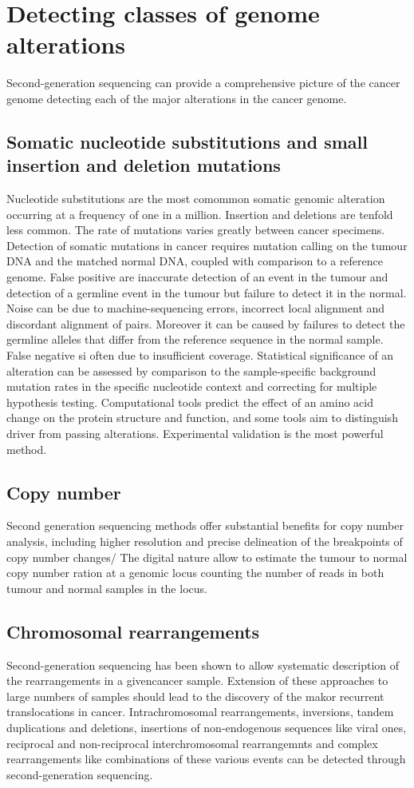 \section{Detecting classes of genome alterations}
Second-generation sequencing can provide a comprehensive picture of the cancer genome detecting each of the major alterations in the cancer genome.

	\subsection{Somatic nucleotide substitutions and small insertion and deletion mutations}
	Nucleotide substitutions are the most comommon somatic genomic alteration occurring at a frequency of one in a million.
	Insertion and deletions are tenfold less common.
	The rate of mutations varies greatly between cancer specimens.
	Detection of somatic mutations in cancer requires mutation calling on the tumour DNA and the matched normal DNA, coupled with comparison to a reference genome.
	False positive are inaccurate detection of an event in the tumour and detection of a germline event in the tumour but failure to detect it in the normal.
	Noise can be due to machine-sequencing errors, incorrect local alignment and discordant alignment of pairs.
	Moreover it can be caused by failures to detect the germline alleles that differ from the reference sequence in the normal sample.
	False negative si often due to insufficient coverage.
	Statistical significance of an alteration can be assessed by comparison to the sample-specific background mutation rates in the specific nucleotide context and correcting for multiple hypothesis testing.
	Computational tools predict the effect of an amino acid change on the protein structure and function, and some tools aim to distinguish driver from passing alterations.
	Experimental validation is the most powerful method.

	\subsection{Copy number}
	Second generation sequencing methods offer substantial benefits for copy number analysis, including higher resolution and precise delineation of the breakpoints of copy number changes/
	The digital nature allow to estimate the tumour to normal copy number ration at a genomic locus counting the number of reads in both tumour and normal samples in the locus.

	\subsection{Chromosomal rearrangements}
	Second-generation sequencing has been shown to allow systematic description of the rearrangements in a givencancer sample.
	Extension of these approaches to large numbers of samples should lead to the discovery of the makor recurrent translocations in cancer.
	Intrachromosomal rearrangements, inversions, tandem duplications and deletions, insertions of non-endogenous sequences like viral ones, reciprocal and non-reciprocal interchromosomal rearrangemnts and complex rearrangements like combinations of these various events can be detected through second-generation sequencing.

